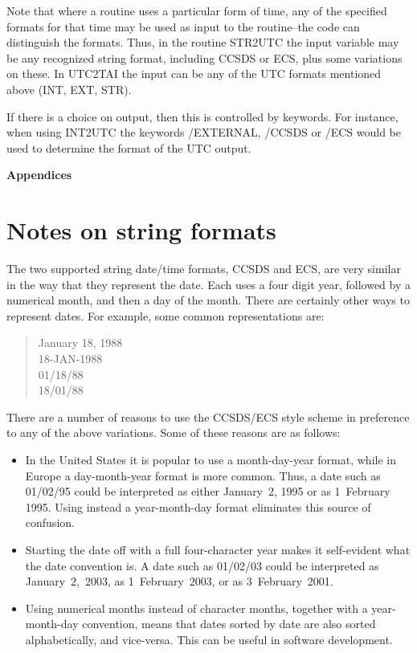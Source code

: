Note that where a routine uses a particular form of time, any of the specified
formats for that time may be used as input to the routine--the code can
distinguish the formats.  Thus, in the routine STR2UTC the input variable may
be any recognized string format, including CCSDS or ECS, plus some variations
on these.  In UTC2TAI the input can be any of the UTC formats mentioned above
(INT, EXT, STR).

If there is a choice on output, then this is controlled by keywords.  For
instance, when using INT2UTC the keywords /EXTERNAL, /CCSDS or /ECS would be
used to determine the format of the UTC output.

\pagebreak

\appendix

\centerline{\Large\bf Appendices}

\section{Notes on string formats}

The two supported string date/time formats, CCSDS and ECS, are very similar in
the way that they represent the date.  Each uses a four digit year, followed by
a numerical month, and then a day of the month.  There are certainly other ways
to represent dates.  For example, some common representations are:
\begin{quote}
January 18, 1988\\
18-JAN-1988\\
01/18/88\\
18/01/88
\end{quote}
There are a number of reasons to use the CCSDS/ECS style scheme in preference
to any of the above variations.  Some of these reasons are as follows:
\begin{itemize}
\item
In the United States it is popular to use a month-day-year format, while in
Europe a day-month-year format is more common.  Thus, a date such as 01/02/95
could be interpreted as either January~2, 1995 or as 1~February 1995.  Using
instead a year-month-day format eliminates this source of confusion.
\item
Starting the date off with a full four-character year makes it self-evident
what the date convention is.  A date such as 01/02/03 could be interpreted as
January~2,~2003, as 1~February~2003, or as 3~February~2001.
\item
Using numerical months instead of character months, together with a
year-month-day convention, means that dates sorted by date are also sorted
alphabetically, and vice-versa.  This can be useful in software development.
\end{itemize}

